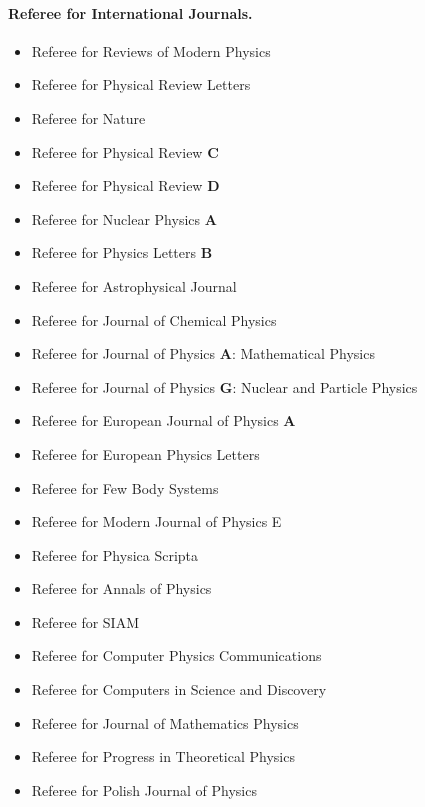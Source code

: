 \documentclass[a4wide,10pt]{article}
\begin{document}
\paragraph{Referee for International Journals.}
\begin{itemize}
\item Referee for Reviews of Modern Physics

\item Referee for Physical Review Letters

\item Referee for Nature

\item Referee for Physical Review \textbf{C}

\item Referee for Physical Review \textbf{D}

\item Referee for Nuclear Physics \textbf{A}

\item Referee for Physics Letters \textbf{B}

\item Referee for Astrophysical Journal

\item Referee for Journal of Chemical Physics

\item Referee for Journal of Physics \textbf{A}: Mathematical Physics

\item Referee for Journal of Physics \textbf{G}: Nuclear and Particle Physics

\item Referee for European Journal of Physics \textbf{A}

\item Referee for European Physics Letters

\item Referee for Few Body Systems

\item Referee for Modern Journal of Physics E

\item Referee for Physica Scripta

\item Referee for Annals of Physics

\item Referee for SIAM

\item Referee for Computer Physics Communications

\item Referee for Computers in Science and Discovery

\item Referee for Journal of Mathematics Physics

\item Referee for Progress in Theoretical Physics

\item Referee for Polish Journal of Physics
\end{itemize}
\end{document}
